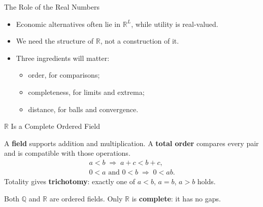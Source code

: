 \documentclass[11pt,aspectratio=169,c]{beamer}
\begin{document}
\begin{frame}{The Role of the Real Numbers}
\begin{itemize}
    \item Economic alternatives often lie in $\mathbb{R}^L$, while utility is
    real-valued.
    \item We need the structure of $\mathbb{R}$, not a construction of it.
    \item Three ingredients will matter:
    \begin{itemize}
        \item order, for comparisons;
        \item completeness, for limits and extrema;
        \item distance, for balls and convergence.
    \end{itemize}
\end{itemize}
\end{frame}

\begin{frame}{$\mathbb{R}$ Is a Complete Ordered Field}
\begin{definitionbox}
A \textbf{field} supports addition and multiplication. A \textbf{total order}
compares every pair and is compatible with those operations.
\[
\begin{gathered}
a<b \;\Longrightarrow\; a+c<b+c,\\
0<a\text{ and }0<b \;\Longrightarrow\; 0<ab.
\end{gathered}
\]
Totality gives \textbf{trichotomy}: exactly one of
$a<b$, $a=b$, $a>b$ holds.
\end{definitionbox}

\vspace{.5em}
Both $\mathbb{Q}$ and $\mathbb{R}$ are ordered fields. Only $\mathbb{R}$ is
\textbf{complete}: it has no gaps.
\end{frame}
\end{document}
